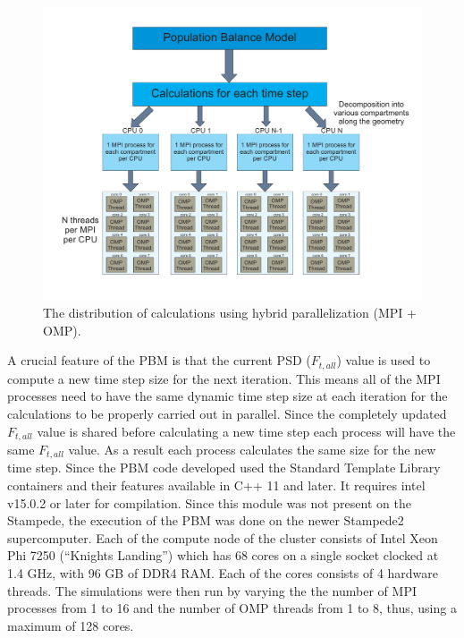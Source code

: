 \documentclass[preprint,11pt,authoryear]{elsarticle}
\begin{document}
\begin{figure}[H]
\centering
\includegraphics[scale=0.5]{PBM_decomposition.pdf}
\caption{The distribution of calculations using hybrid parallelization (MPI + OMP).}
\label{fig:mthds_PBM_decompostion}
\end{figure}

 A crucial feature of the PBM is that the current PSD ($F_{t,all}$) value is used to compute a new 
time step size for the next iteration. This means all of the MPI processes need to have the same 
dynamic time step size at each iteration for the calculations to be properly carried out in parallel. Since 
the completely updated $F_{t,all}$ value is shared before calculating a new time step each process will 
have the same $F_{t,all}$ value. As a result each process calculates the same size for the new time 
step. 
 Since the PBM code developed used the Standard Template Library containers and their features available in C++ 11 and later. It requires intel v15.0.2 or
later for compilation. Since this module was not present on the Stampede, the execution of the PBM was done on
the newer Stampede2 supercomputer. Each of the compute node of the cluster consists of Intel Xeon Phi 7250 
(\textquotedblleft Knights Landing\textquotedblright) which has 68 cores on a single socket clocked at 1.4 GHz, with 96 GB of DDR4 RAM. Each of 
the cores consists of 4 hardware threads. The simulations were then run by varying the the number of MPI 
processes from 1 to 16 and the number of OMP threads from 1 to 8, thus, using a maximum of 128 cores.
\end{document}
